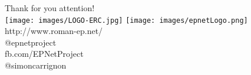 \documentclass[12pt, notes=show]{beamer}
\begin{document}
%	
%
	\begin{frame}{}
		\begin{center}
			\huge
			Thank for you attention!\\\vfill
			\texttt{[image: images/LOGO-ERC.jpg]} \hfil	\texttt{[image: images/epnetLogo.png]}\\
			\vspace{1cm}
			\scriptsize
			http://www.roman-ep.net/\\
			@epnetproject\\
			fb.com/EPNetProject\\
			@simoncarrignon
		\end{center}


	\end{frame}

	
\end{document}
